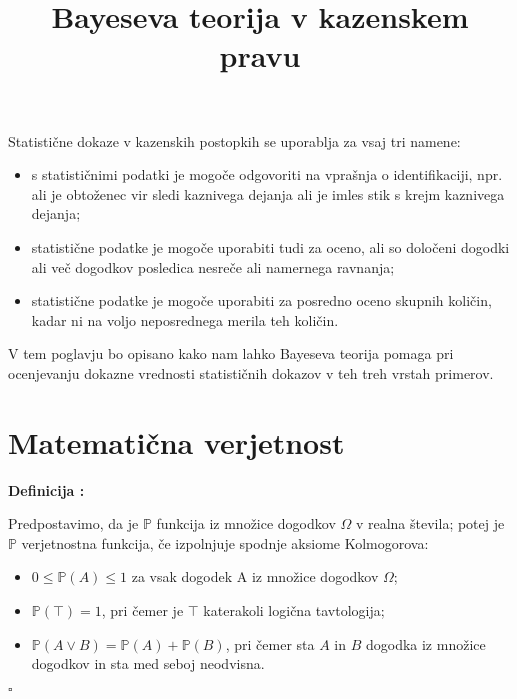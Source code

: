 \documentclass[a4paper,12pt]{article}
\newcounter{definicija}
\newenvironment{definicija}
{
   \stepcounter{definicija}
   \begin{flushleft}
   \textbf{Definicija \arabic{definicija}: }
}
{
   \hfill $\square$
   \end{flushleft}
}
\begin{document}
\title{Bayeseva teorija v kazenskem pravu}
\maketitle

Statistične dokaze v kazenskih postopkih se uporablja za vsaj tri namene:
\begin{itemize}
    \item s statističnimi podatki je mogoče odgovoriti na vprašnja o 
    identifikaciji, npr. ali je obtoženec vir sledi kaznivega dejanja ali je imles stik s krejm kaznivega dejanja;
    \item statistične podatke je mogoče uporabiti tudi za oceno, ali so določeni dogodki ali več dogodkov posledica nesreče ali namernega ravnanja;
    \item statistične podatke je mogoče uporabiti za posredno oceno skupnih količin, kadar ni na voljo neposrednega merila teh količin. 
\end{itemize}  
V tem poglavju bo opisano kako nam lahko Bayeseva teorija pomaga pri ocenjevanju dokazne vrednosti statističnih dokazov v teh treh vrstah primerov.

\section{Matematična verjetnost}
\begin{definicija}
Predpostavimo, da je $\mathbb{P}$ funkcija iz množice dogodkov $\Omega$ v realna števila; potej je $\mathbb{P}$ verjetnostna funkcija, če izpolnjuje spodnje aksiome Kolmogorova:\\
\begin{itemize}
    \item $0 \le \mathbb{P}(A) \le 1$ za vsak dogodek A iz množice dogodkov $\Omega$;
    \item $\mathbb{P}(\top)=1$, pri čemer je $\top$ katerakoli logična tavtologija;
    \item $\mathbb{P}(A \vee B) = \mathbb{P}(A) + \mathbb{P}(B)$, pri čemer sta $A$ in $B$ dogodka iz množice dogodkov in sta med seboj neodvisna.
\end{itemize}
\end{definicija}
\end{document}
